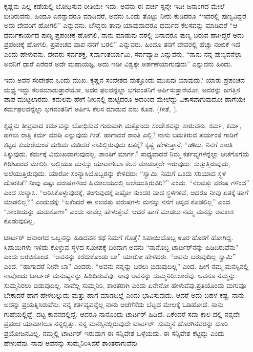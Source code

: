 ಕೃಷ್ಣನು ಎಲ್ಲ ಕಡೆಯಲ್ಲಿ ಬೋಧಿಸುವ ರೀತಿಯೇ ಇದು. ಅವನು ಈ ವರ್ಚ ಸ್ಸನ್ನೇ ಇಡೀ ಜನಾಂಗದ ಮೇಲೆ ಬೀರಿರುವನು. ಹಿಂದೂ ಏನನ್ನಾದರೂ ಮಾಡಿದರೆ, ಅವನು ಒಂದು ತೊಟ್ಟು ನೀರು ಕುಡಿದರೂ “ಇದರಲ್ಲಿ ಪುಣ್ಯವಿದ್ದರೆ ಅದು ದೇವರಿಗೆ ಹೋಗಲಿ” ಎನ್ನುವನು. ಬೌದ್ಧರು ತಾವು ಯಾವುದಾದರೂ ಧರ್ಮದ ಕೆಲಸವನ್ನು ಮಾಡಿದರೆ “ಆ ಧರ್ಮಕಾರ್ಯದ ಪುಣ್ಯ ಪ್ರಪಂಚಕ್ಕೆ ಹೋಗಲಿ, ನಾನು ಮಾಡುವು ದರಲ್ಲಿ ಏನಾದರೂ ಪುಣ್ಯ ಬರುವ ಹಾಗಿದ್ದರೆ ಅದು ಪ್ರಪಂಚಕ್ಕೆ ಹೋಗಲಿ, ಪ್ರಪಂಚದ ಪಾಪ ನನಗೆ ಬರಲಿ” ಎನ್ನುವರು. ಹಿಂದೂ ತನಗೆ ದೇವರಲ್ಲಿ ಹೆಚ್ಚು ನಂಬಿಕೆ ಇದೆ ಎಂದು ಹೇಳುವನು. ದೇವರು ಸರ್ವಶಕ್ತ, ಸರ್ವಾಂತರ್ಯಾಮಿ, ಸರ್ವವ್ಯಾಪಿ ಎನ್ನುವನು. “ನಾನು ನನ್ನ ಪುಣ್ಯವನೆಲ್ಲಾ ಅವನಿಗೆ ಧಾರೆ ಎರೆದರೆ ಅದೇ ಮಹಾಯಜ್ಞ. ಅದು ಇಡೀ ವಿಶ್ವಕ್ಕೇ ಅರ್ಪಣೆಯಾಗುವುದು” ಎನ್ನುವನು ಹಿಂದು.

ಇದು ಅವನ ಸಂದೇಶದ ಒಂದು ಮುಖ. ಕೃಷ್ಣನ ಸಂದೇಶದ ಮತ್ತೊಂದು ಮುಖವು ಯಾವುದು? ಯಾರು ಪ್ರಪಂಚದ ಮಧ್ಯೆ ಇದ್ದು ಕೆಲಸಮಾಡುತ್ತಾರೆಯೋ, ಅದರ ಫಲವನ್ನೆಲ್ಲಾ ಭಗವಂತನಿಗೆ ಅರ್ಪಿಸುತ್ತಾರೆಯೋ, ಅವರನ್ನು ಜಗತ್ತಿನ ಪಾಪ ಮುಟ್ಟಲಾರದು. ಕಮಲವು ಹೇಗೆ ನೀರಿನಲ್ಲಿ ಹುಟ್ಟಿದರೂ ಅದರಿಂದ ಮೇಲೆದ್ದು ವಿಕಾಸವಾಗುವುದೋ ಹಾಗೆಯೇ ಕರ್ಮಫಲವನ್ನೆಲ್ಲಾ ಭಗವಂತನಿಗೆ ಅರ್ಪಿಸಿ ಕೆಲಸ ಮಾಡುವ ವನು ಕೂಡ. (ಗೀತೆ, ).

ಕೃಷ್ಣನು ತೀವ್ರವಾದ ಕರ್ಮವನ್ನು ಬೋಧಿಸುವ ಗುರುವಾಗಿ ಮತ್ತೊಂದು ಸಂದೇಶವನ್ನು ಸಾರುವನು. ಕರ್ಮ, ಕರ್ಮ, ಹಗಲು ರಾತ್ರಿ ಕರ್ಮ ಮಾಡಿ ಎನ್ನುವುದು ಗೀತೆ. ಹಾಗಾದರೆ ಶಾಂತಿ ಎಲ್ಲಿ? ನಾನು ಬದುಕಿರುವ ಪರ್ಯಂತ ಗಾಡಿಗೆ ಕಟ್ಟಿದ ಕುದುರೆಯಂತೆ ದುಡಿದು ಮಡಿದರೆ ನಾವಿಲ್ಲಿರುವುದು ಏತಕ್ಕೆ? ಕೃಷ್ಣ ಹೇಳುತ್ತಾನೆ, “ಹೌದು, ನಿನಗೆ ಶಾಂತಿ ಸಿಕ್ಕುವುದು. ಕರ್ಮಕ್ಕೆ ವಿಮುಖವಾಗುವುದಲ್ಲ, ಶಾಂತಿಗೆ ಮಾರ್ಗ.” ಸಾಧ್ಯವಾದರೆ ನಿಮ್ಮ ಕರ್ತವ್ಯಗಳನ್ನೆಲ್ಲಾ ಆಚೆಗೊಗೆದು ಗಿರಿಶಿಖರದ ಮೇಲಿರಿ. ಅಲ್ಲಿಯೂ ಮನಸ್ಸು ಯಾವಾಗಲೂ ಕೆಲಸ ಮಾಡುತ್ತಲೇ ಇರುವುದು. ಸುತ್ತುತ್ತಿರುವುದು, ಅಲೆಯುತ್ತಿರುವುದು. ಯಾರೋ ಸಂನ್ಯಾಸಿಯೊಬ್ಬರನ್ನು ಕೇಳಿದರು: “ಸ್ವಾಮಿ, ನಿಮಗೆ ಒಂದು ಸರಿಯಾದ ಸ್ಥಳ ದೊರಕಿತೆ? ನೀವು ಎಷ್ಟು ವರುಷಗಳಿಂದ ಹಿಮಾಲಯದಲ್ಲಿ ಅಲೆಯುತ್ತಿರುವಿರಿ?” ಎಂದು. “ನಲವತ್ತು ವರುಷ ಗಳಿಂದ” ಎಂದ ಸಂನ್ಯಾಸಿ. “ಆರಿಸಿಕೊಳ್ಳುವುದಕ್ಕೆ, ತಂಗುವುದಕ್ಕೆ ಎಷ್ಟೋ ಸುಂದರ ವಾದ ಸ್ಥಳಗಳಿವೆ, ಆದರೂ ನೀವು ಏತಕ್ಕೆ ಹಾಗೆ ಮಾಡಲಿಲ್ಲ?” ಎಂದುದಕ್ಕೆ: “ಏಕೆಂದರೆ ಈ ನಲವತ್ತು ವರುಷಗಳು ಮನಸ್ಸು ನನಗೆ ಆಸ್ಪದ ಕೊಡಲಿಲ್ಲ” ಎಂದ. “ಶಾಂತಿಯನ್ನು ಹುಡುಕೋಣ” ಎಂದು ನಾವೆಲ್ಲ ಹೇಳುತ್ತೇವೆ. ಆದರೆ ಹಾಗೆ ಮಾಡಲು ನಮ್ಮ ಮನಸ್ಸು ಅವಕಾಶ ಕೊಡುವುದಿಲ್ಲ.

ಟಾರ್ಟರ್​ ಜನಾಂಗದ ಒಬ್ಬನನ್ನು ಹಿಡಿದವನ ಕಥೆ ನಿಮಗೆ ಗೊತ್ತೆ? ಸಿಪಾಯಿಯೊಬ್ಬ ಊರ ಹೊರಗೆ ಹೋಗಿದ್ದ. ಸಿಪಾಯಿಗಳು ಇಳಿದು ಕೊಳ್ಳುವ ಸ್ಥಳದ ಸಮೀಪಕ್ಕೆ ಬಂದಾಗ ಅವನು “ನಾನೊಬ್ಬ ಟಾರ್ಟರ್​ನನ್ನು ಹಿಡಿದಿರುವೆನು” ಎಂದು ಅರಚಿಕೊಂಡ. “ಅವನನ್ನು ಕರೆದುಕೊಂಡು ಬಾ” ಯಾರೋ ಹೇಳಿದರು. “ಅವನು ಬರುವುದಿಲ್ಲ ಸ್ವಾಮಿ” ಎಂದ. “ಹಾಗಾದರೆ ನೀನೇ ಬಾ” ಎಂದರು. “ಅವನು ನನ್ನನ್ನು ಬರಲು ಬಿಡುವುದಿಲ್ಲ” ಎಂದ. ಹೀಗೆ ನಮ್ಮ ಮನಸ್ಸಿನಲ್ಲಿ ನಾವೊಂದು ಟಾರ್ಟರ್​ ಮನುಷ್ಯನನ್ನು ಹಿಡಿದಿರುವೆವು. ನಾವು ಅವನನ್ನು ಸುಮ್ಮನಿರಿಸಲಾರೆವು. ಅವನೂ ನಮ್ಮನ್ನು ಸುಮ್ಮನಿರಲು ಬಿಡುವುದಿಲ್ಲ. ನಾವೆಲ್ಲ ಸುಮ್ಮನಿರಿ, ಶಾಂತರಾಗಿ ಎಂದು ಏನೇನೋ ಹೇಳುವೆವು.ಪ್ರತಿಯೊಂದು ಮಗುವೂ ಬೇಕಾದರೆ ಹಾಗೆ ಹೇಳಬಲ್ಲುದು ಮತ್ತು ಹಾಗೆ ಮಾಡಬಲ್ಲೆ ಎಂದು ಭಾವಿಸುವುದು. ಆದರೆ ಅದು ಬಹಳ ಕಷ್ಟ. ನಾನು ಅದನ್ನು ಪ್ರಯತ್ನಿಸಿರುವೆನು. ನನ್ನ ಕರ್ತವ್ಯವನ್ನೆಲ್ಲ ನಾನು ಆಚೆಗೆಸೆದು ಬೆಟ್ಟದ ಮೇಲಕ್ಕೆ ಓಡಿಹೋದೆ. ನಾನು ಗುಹೆಯಲ್ಲಿದ್ದೆ. ದಟ್ಟ ಕಾನನದಲ್ಲಿದ್ದೆ. ಆದರೂ ನಾನೊಂದು ಟಾರ್ಟರ್​ ಹಿಡಿದೆ. ಏಕೆಂದರೆ ಸದಾ ಕಾಲ ದಲ್ಲಿ ನನ್ನದೇ ಪ್ರಪಂಚ ಯಾವಾಗಲೂ ನನ್ನಲ್ಲಿತ್ತು. ನನ್ನ ಮನಸ್ಸಿನಲ್ಲಿರುವುದೇ ಟಾರ್ಟರ್​. ಸುಮ್ಮನೆ ಹೊರಗಿನವರನ್ನು ದೂರಿ ಪ್ರಯೋಜನವಿಲ್ಲ. ನಮ್ಮಲ್ಲಿ ಟಾರ್ಟರ್​ ಇರುವಾಗ ಈ ಸನ್ನಿವೇಶ ಒಳ್ಳೆಯದು. ಈ ಸನ್ನಿವೇಶ ಕೆಟ್ಟದ್ದು ಎಂದು ಹೇಳುವೆವು. ನಾವು ಅವನನ್ನು ಸುಮ್ಮನಿರಿಸಿದರೆ ಶಾಂತರಾಗುವೆವು.

